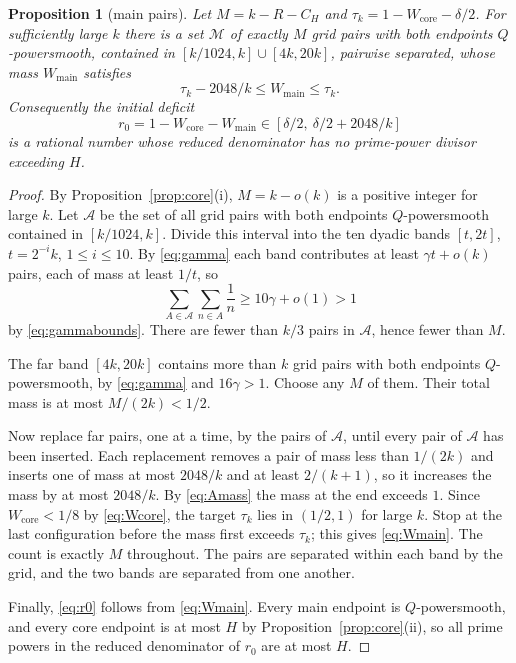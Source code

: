 \documentclass[11pt,letterpaper]{article}
\numberwithin{equation}{section}
\theoremstyle{plain}
\newtheorem{proposition}{Proposition}
\theoremstyle{remark}
\newcommand{\cA}{\mathcal A}
\newcommand{\cM}{\mathcal M}
\newcommand{\core}{\mathrm{core}}
\newcommand{\main}{\mathrm{main}}
\begin{document}
\begin{proposition}[main pairs]\label{prop:main}
Let $M=k-R-C_H$ and $\tau_k=1-W_{\core}-\delta/2$. For sufficiently large $k$ there is a set $\cM$ of exactly $M$ grid pairs with both endpoints $Q$-powersmooth, contained in $[k/1024,k]\cup[4k,20k]$, pairwise separated, whose mass $W_{\main}$ satisfies
\begin{equation}\label{eq:Wmain}
\tau_k-2048/k\le W_{\main}\le\tau_k .
\end{equation}
Consequently the initial deficit
\begin{equation}\label{eq:r0}
r_0=1-W_{\core}-W_{\main}\in[\delta/2,\ \delta/2+2048/k]
\end{equation}
is a rational number whose reduced denominator has no prime-power divisor exceeding $H$.
\end{proposition}

\begin{proof}
By Proposition~\ref{prop:core}(i), $M=k-o(k)$ is a positive integer for large $k$. Let $\cA$ be the set of all grid pairs with both endpoints $Q$-powersmooth contained in $[k/1024,k]$. Divide this interval into the ten dyadic bands $[t,2t]$, $t=2^{-i}k$, $1\le i\le10$. By \eqref{eq:gamma} each band contributes at least $\gamma t+o(k)$ pairs, each of mass at least $1/t$, so
\begin{equation}\label{eq:Amass}
\sum_{A\in\cA}\sum_{n\in A}\frac1n\ge10\gamma+o(1)>1
\end{equation}
by \eqref{eq:gammabounds}. There are fewer than $k/3$ pairs in $\cA$, hence fewer than $M$.

The far band $[4k,20k]$ contains more than $k$ grid pairs with both endpoints $Q$-powersmooth, by \eqref{eq:gamma} and $16\gamma>1$. Choose any $M$ of them. Their total mass is at most $M/(2k)<1/2$.

Now replace far pairs, one at a time, by the pairs of $\cA$, until every pair of $\cA$ has been inserted. Each replacement removes a pair of mass less than $1/(2k)$ and inserts one of mass at most $2048/k$ and at least $2/(k+1)$, so it increases the mass by at most $2048/k$. By \eqref{eq:Amass} the mass at the end exceeds $1$. Since $W_{\core}<1/8$ by \eqref{eq:Wcore}, the target $\tau_k$ lies in $(1/2,1)$ for large $k$. Stop at the last configuration before the mass first exceeds $\tau_k$; this gives \eqref{eq:Wmain}. The count is exactly $M$ throughout. The pairs are separated within each band by the grid, and the two bands are separated from one another.

Finally, \eqref{eq:r0} follows from \eqref{eq:Wmain}. Every main endpoint is $Q$-powersmooth, and every core endpoint is at most $H$ by Proposition~\ref{prop:core}(ii), so all prime powers in the reduced denominator of $r_0$ are at most $H$.
\end{proof}
\end{document}
